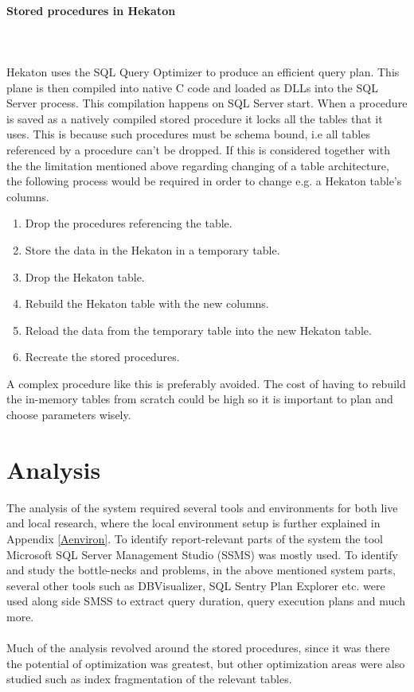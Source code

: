 \documentclass{cslthse-msc}
\begin{document}
\paragraph*{Stored procedures in Hekaton}\mbox{}\\\\ 
Hekaton uses the SQL Query Optimizer to produce an efficient query plan. This plane is then compiled into native C code and loaded as DLLs into the SQL Server process. This compilation happens on SQL Server start.
When a procedure is saved as a natively  compiled stored procedure it locks all the tables that it uses. This is because such procedures must be schema bound, i.e all tables referenced by a procedure can't be dropped. If this is considered together with the the limitation mentioned above regarding changing of a table architecture, the following process would be required in order to change e.g. a Hekaton table's columns\cite{Nevarez}.
\begin{enumerate}
\item Drop the procedures referencing the table.
\item Store the data in the Hekaton in a temporary table.
\item Drop the Hekaton table.
\item Rebuild the Hekaton table with the new columns.
\item Reload the data from the temporary table into the new Hekaton table. 
\item Recreate the stored procedures.
\end{enumerate}

A complex procedure like this is preferably avoided. The cost of having to rebuild the in-memory tables from scratch could be high so it is important to plan and choose parameters wisely.


\section{Analysis}
The analysis of the system required several tools and environments for both live and local research, where the local environment setup is further explained in Appendix \ref{Aenviron}. To identify report-relevant parts of the system the tool Microsoft SQL Server Management Studio (SSMS) was mostly used. To identify and study the bottle-necks and problems, in the above mentioned system parts, several other tools such as DBVisualizer, SQL Sentry Plan Explorer etc. were used along side SMSS to extract query duration, query execution plans and much more.\\\\
Much of the analysis revolved around the stored procedures, since it was there the potential of optimization was greatest, but other optimization areas were also studied such as index fragmentation of the relevant tables.      
\end{document}
